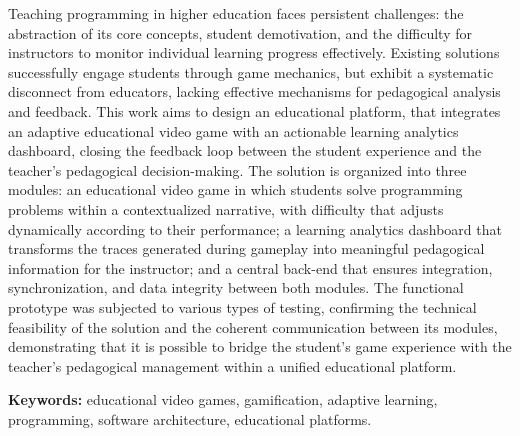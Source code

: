 Teaching programming in higher education faces persistent challenges: the abstraction
of its core concepts, student demotivation, and the difficulty for instructors to
monitor individual learning progress effectively. Existing solutions successfully engage
students through game mechanics, but exhibit a systematic disconnect from educators,
lacking effective mechanisms for pedagogical analysis and feedback. This work aims to
design an educational platform, that integrates an adaptive
educational video game with an actionable learning analytics dashboard, closing the
feedback loop between the student experience and the teacher's pedagogical
decision-making. The solution is organized into three modules: an educational video game
in which students solve programming problems within a contextualized narrative, with
difficulty that adjusts dynamically according to their performance; a learning analytics
dashboard that transforms the traces generated during gameplay into meaningful
pedagogical information for the instructor; and a central back-end that ensures
integration, synchronization, and data integrity between both modules. The functional
prototype was subjected to various types of testing, confirming the technical feasibility
of the solution and the coherent communication between its modules, demonstrating that
it is possible to bridge the student's game experience with the teacher's pedagogical
management within a unified educational platform.

\textbf{Keywords: } educational video games, gamification, adaptive learning,
programming, software architecture, educational platforms.